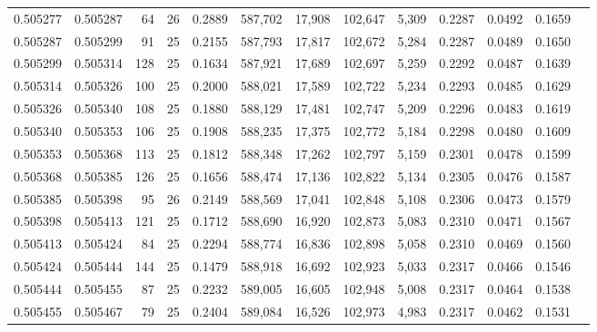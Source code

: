 \begin{tabular}{rrrrrrrrrrrrr}
0.505277 & 0.505287 &  64 &  26 &                                     0.2889 & 587,702 &  17,908 & 102,647 &   5,309 & 0.2287 & 0.0492 & 0.1659 \\
0.505287 & 0.505299 &  91 &  25 &                                     0.2155 & 587,793 &  17,817 & 102,672 &   5,284 & 0.2287 & 0.0489 & 0.1650 \\
0.505299 & 0.505314 & 128 &  25 &                                     0.1634 & 587,921 &  17,689 & 102,697 &   5,259 & 0.2292 & 0.0487 & 0.1639 \\
0.505314 & 0.505326 & 100 &  25 &                                     0.2000 & 588,021 &  17,589 & 102,722 &   5,234 & 0.2293 & 0.0485 & 0.1629 \\
0.505326 & 0.505340 & 108 &  25 &                                     0.1880 & 588,129 &  17,481 & 102,747 &   5,209 & 0.2296 & 0.0483 & 0.1619 \\
0.505340 & 0.505353 & 106 &  25 &                                     0.1908 & 588,235 &  17,375 & 102,772 &   5,184 & 0.2298 & 0.0480 & 0.1609 \\
0.505353 & 0.505368 & 113 &  25 &                                     0.1812 & 588,348 &  17,262 & 102,797 &   5,159 & 0.2301 & 0.0478 & 0.1599 \\
0.505368 & 0.505385 & 126 &  25 &                                     0.1656 & 588,474 &  17,136 & 102,822 &   5,134 & 0.2305 & 0.0476 & 0.1587 \\
0.505385 & 0.505398 &  95 &  26 &                                     0.2149 & 588,569 &  17,041 & 102,848 &   5,108 & 0.2306 & 0.0473 & 0.1579 \\
0.505398 & 0.505413 & 121 &  25 &                                     0.1712 & 588,690 &  16,920 & 102,873 &   5,083 & 0.2310 & 0.0471 & 0.1567 \\
0.505413 & 0.505424 &  84 &  25 &                                     0.2294 & 588,774 &  16,836 & 102,898 &   5,058 & 0.2310 & 0.0469 & 0.1560 \\
0.505424 & 0.505444 & 144 &  25 &                                     0.1479 & 588,918 &  16,692 & 102,923 &   5,033 & 0.2317 & 0.0466 & 0.1546 \\
0.505444 & 0.505455 &  87 &  25 &                                     0.2232 & 589,005 &  16,605 & 102,948 &   5,008 & 0.2317 & 0.0464 & 0.1538 \\
0.505455 & 0.505467 &  79 &  25 &                                     0.2404 & 589,084 &  16,526 & 102,973 &   4,983 & 0.2317 & 0.0462 & 0.1531 \\

\end{tabular}
